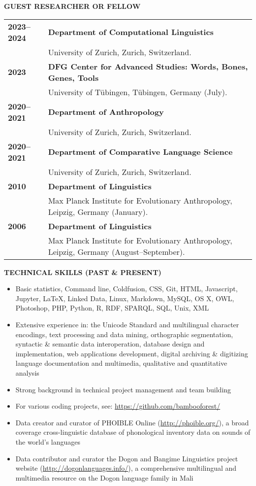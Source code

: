 \documentclass[11pt]{article}
\begin{document}
\vskip 20pt
\begin{flushleft}
{\bf GUEST RESEARCHER OR FELLOW}
\end{flushleft}
\begin{tabular}{lp{5.5in}}
\bf 2023--2024	& {\bf Department of Computational Linguistics} \\
& University of Zurich, Zurich, Switzerland. \\
\bf 2023	& {\bf DFG Center for Advanced Studies: Words, Bones, Genes, Tools} \\
& University of Tübingen, Tübingen, Germany (July). \\
\bf 2020--2021	& {\bf Department of Anthropology} \\
& University of Zurich, Zurich, Switzerland. \\
\bf 2020--2021	& {\bf Department of Comparative Language Science} \\
& University of Zurich, Zurich, Switzerland. \\
\bf 2010	& {\bf Department of Linguistics}\\
& Max Planck Institute for Evolutionary Anthropology, Leipzig, Germany (January).  \\
\bf 2006	& {\bf Department of Linguistics}\\
& Max Planck Institute for Evolutionary Anthropology, Leipzig, Germany (August--September).  \\
\end{tabular}

\vskip 24pt
\begin{flushleft}
{\bf TECHNICAL SKILLS (PAST \& PRESENT)}
\end{flushleft}
\begin{itemize}
\item Basic statistics, Command line, Coldfusion, CSS, Git, HTML, Javascript, Jupyter, \LaTeX, Linked Data, Linux, Markdown, MySQL, OS X, OWL, Photoshop, PHP, Python, R, RDF, SPARQL, SQL, Unix, XML
\item Extensive experience in: the Unicode Standard and multilingual character encodings, text processing and data mining, orthographic segmentation, syntactic \& semantic data interoperation, database design and implementation, web applications development, digital archiving \& digitizing language documentation and multimedia, qualitative and quantitative analysis
\item Strong background in technical project management and team building
\item For various coding projects, see: \url{https://github.com/bambooforest/}
\item Data creator and curator of PHOIBLE Online (\url{http://phoible.org/}), a broad coverage cross-linguistic database of phonological inventory data on sounds of the world's languages
\item Data contributor and curator the Dogon and Bangime Linguistics project website (\url{http://dogonlanguages.info/}), a comprehensive multilingual and multimedia resource on the Dogon language family in Mali
\end{itemize}
\end{document}
